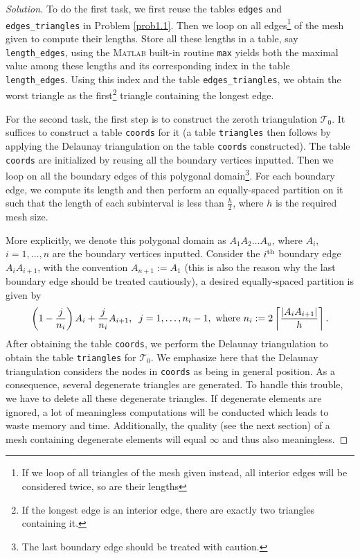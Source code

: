 \documentclass[11pt,a4paper,center,notitlepage]{article}
\numberwithin{equation}{section}
\begin{document}
\begin{proof}[Solution]
To do the first task, we first reuse the tables \verb|edges| and \verb|edges_triangles| in Problem \ref{prob1.1}. Then we loop on all edges\footnote{If we loop of all triangles of the mesh given instead, all interior edges will be considered twice, so are their lengths} of the mesh given to compute their lengths. Store all these lengths in a table, say \verb|length_edges|, using the \textsc{Matlab} built-in routine \texttt{max} yields both the maximal value among these lengths and its corresponding index in the table \verb|length_edges|. Using this index and the table \verb|edges_triangles|, we obtain the worst triangle as the first\footnote{If the longest edge is an interior edge, there are exactly two triangles containing it.} triangle containing the longest edge.

For the second task, the first step is to construct the zeroth triangulation $\mathcal{T}_0$. It suffices to construct a table \verb|coords| for it (a table \verb|triangles| then follows by applying the Delaunay triangulation on the table \verb|coords| constructed). The table \verb|coords| are initialized by reusing all the boundary vertices inputted. Then we loop on all the boundary edges of this polygonal domain\footnote{The last boundary edge should be treated with caution.}. For each boundary edge, we compute its length and then perform an equally-spaced partition on it such that the length of each subinterval is less than $\frac{h}{2}$, where $h$ is the required mesh size. 

More explicitly, we denote this polygonal domain as $A_1 A_2\ldots A_n$, where $A_i$, $i=1,\ldots,n$ are the boundary vertices inputted. Consider the $i^{\rm th}$ boundary edge $A_i A_{i+1}$, with the convention $A_{n+1}:=A_1$ (this is also the reason why the last boundary edge should be treated cautiously), a desired equally-spaced partition is given by
\begin{align}
\left( {1 - \frac{j}{{{n_i}}}} \right){A_i} + \frac{j}{{{n_i}}}{A_{i + 1}},\hspace{2mm} j = 1, \ldots ,{n_i} - 1,\mbox{ where } {n_i}: = 2\left\lceil {\frac{{\left| {{A_i}{A_{i + 1}}} \right|}}{h}} \right\rceil .
\end{align}
After obtaining the table \verb|coords|, we perform the Delaunay triangulation to obtain the table \verb|triangles| for $\mathcal{T}_0$. We emphasize here that the Delaunay triangulation considers the nodes in \verb|coords| as being in general position. As a consequence, several degenerate triangles are generated. To handle this trouble, we have to delete all these degenerate triangles. If degenerate elements are ignored, a lot of meaningless computations will be conducted which leads to waste memory and time. Additionally, the quality (see the next section) of a mesh containing degenerate elements will equal $\infty$ and thus also meaningless. 


\end{proof}
\end{document}
